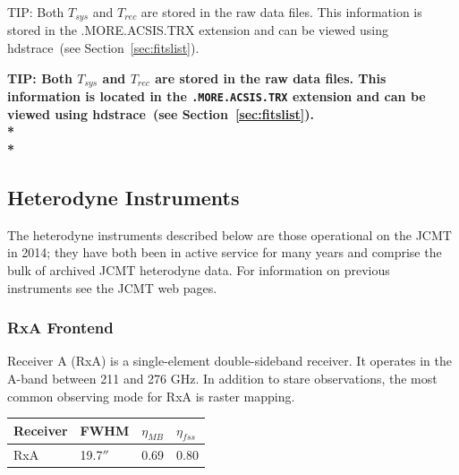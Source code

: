 \documentclass[twoside,11pt]{article}
\newcommand{\htmlref}[2]{#1}
\newenvironment{latexonly}{}{}
\newcommand{\latexhtml}[2]{#1}
\newcommand{\xref}[3]{#1}
\newcommand{\xlabel}[1]{}
\renewcommand{\_}{\texttt{\symbol{95}}}
\newenvironment{fmpage}[1]{\begin{lrbox}{\fmbox}\begin{minipage}{#1}}{\end{minipage}\end{lrbox}\fbox{\usebox{\fmbox}}}
\newcommand{\task}[1]{\textsf{#1}}
\newcommand{\hdstrace}{\xref{\task{hdstrace}}{sun95}{HDSTRACE}}
\newcommand{\cref}[3]{\latexhtml{#1~\ref{#2}}{\htmlref{#3}{#2}}}
\begin{document}
 
\begin{latexonly}
\begin{center}
\begin{fmpage}{0.95\linewidth}
\vspace{0.1cm}
TIP: Both $T_{sys}$ and $T_{rec}$ are stored in the raw data files. This information is stored in the .MORE.ACSIS.TRX extension and can be viewed using \hdstrace\ (see \cref{Section}{sec:fitslist}{How can I view the metadata?}).
\end{fmpage}
\end{center}
\end{latexonly}

\begin{htmlonly}
\textbf{TIP: Both $T_{sys}$ and $T_{rec}$ are stored in the raw data files. This information is located in the \texttt{.MORE.ACSIS.TRX} extension and can be viewed using \hdstrace\ (see \cref{Section}{sec:fitslist}{How can I view the metadata?}).\\*\\*}
\end{htmlonly}


\subsection{\xlabel{rxa}Heterodyne Instruments}
\label{sec:instruments}

The heterodyne instruments described below are those operational on the JCMT in 2014; they have both been in active service for many years and comprise the bulk of archived JCMT heterodyne data. For information on previous instruments see the JCMT web pages.  

\subsubsection{RxA Frontend}
Receiver A (RxA) is a single-element double-sideband receiver. It operates in the A-band between 211 and 276 GHz. In addition to stare observations, the most common observing mode for RxA is raster mapping.
\begin{table}[h!]
\begin{center}
\begin{tabular}{|p{1.5cm}|p{1.2cm}|p{0.8cm}|p{0.8cm}|}
\hline
Receiver &FWHM & $\eta_{MB}$ & $\eta_{fss}$\\
\hline
RxA&19.7$''$&0.69 & 0.80\\
\hline
\end{tabular}
\end{center}
\end{table}
\end{document}
